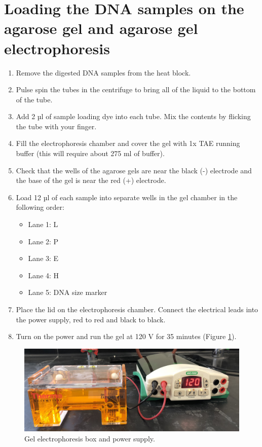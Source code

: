 \section{Loading the DNA samples on the agarose gel and agarose gel electrophoresis}\label{loading-the-dna-samples-on-the-agarose-gel-and-agarose-gel-electrophoresis}

\begin{enumerate}
\def\labelenumi{\arabic{enumi}.}
\tightlist
\item
  Remove the digested DNA samples from the heat block.
\item
  Pulse spin the tubes in the centrifuge to bring all of the liquid to the bottom of the tube.
\item
  Add 2 µl of sample loading dye into each tube. Mix the contents by flicking the tube with your finger.
\item
  Fill the electrophoresis chamber and cover the gel with 1x TAE running buffer (this will require about 275 ml of buffer).
\item
  Check that the wells of the agarose gels are near the black (-) electrode and the base of the gel is near the red (+) electrode.
\item
  Load 12 µl of each sample into separate wells in the gel chamber in the following order:

  \begin{itemize}
  \tightlist
  \item
    Lane 1: L
  \item
    Lane 2: P
  \item
    Lane 3: E
  \item
    Lane 4: H
  \item
    Lane 5: DNA size marker
  \end{itemize}
\item
  Place the lid on the electrophoresis chamber. Connect the electrical leads into the power supply, red to red and black to black.
\item
  Turn on the power and run the gel at 120 V for 35 minutes (Figure \ref{fig:power}).
\end{enumerate}

\begin{figure}

{\centering \includegraphics[width=0.7\linewidth]{./figures/molbio/Power_supply} 

}

\caption{Gel electrophoresis box and power supply.}\label{fig:power}
\end{figure}

